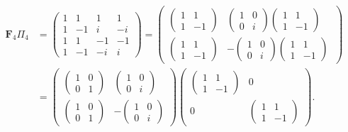 \[
\begin{aligned}
\mathbf{F}_4 \Pi_4 &=
\left(
\begin{array}{cccc}
1 & 1  & 1  & 1   \\
1 & -1  & i & -i \\
1 & 1 & -1  & -1 \\
1 & -1 & -i & i
\end{array}
\right)
= \left(\!\!\!\begin{array}{cc}
\left(\!\!\begin{array}{cc}1 & 1 \\ 1 & -1 \end{array}\!\!\right)
 & \left(\!\!\begin{array}{cc}1 & 0 \\ 0 & i \end{array}\!\!\right)
   \left(\!\!\begin{array}{cc}1 & 1 \\ 1 & -1 \end{array}\!\!\right) \\
\left(\!\!\begin{array}{cc}1 & 1 \\ 1 & -1 \end{array}\!\!\right)
 & -\left(\!\!\begin{array}{cc}1 & 0 \\ 0 & i \end{array}\!\!\right)
    \left(\!\!\begin{array}{cc}1 & 1 \\ 1 & -1 \end{array}\!\!\right) \
\end{array}\!\!\!\right) \\
& = \left(\begin{array}{cc}
\left(\!\!\begin {array}{cc} 1 & 0 \\ 0 & 1 \end{array}\!\!\right) & 
\left(\!\!\begin {array}{cc} 1 & 0 \\ 0 & i \end{array}\!\!\right) \\
\left(\!\!\begin {array}{cc} 1 & 0 \\ 0 & 1 \end{array}\!\!\right) & 
-\left(\!\!\begin {array}{cc} 1 & 0 \\ 0 & i \end{array}\!\!\right) 
\end{array}\right)
\left(\!\!\!\begin{array}{cc}
\left(\!\!\begin{array}{cc}1 & 1 \\ 1 & -1 \end{array}\!\!\right) & 0 \\ 
0 & \left(\!\!\begin{array}{cc}1 & 1 \\ 1 & -1 \end{array}\!\!\right) \end{array}\!\!\!\right).
\end{aligned}
\]
